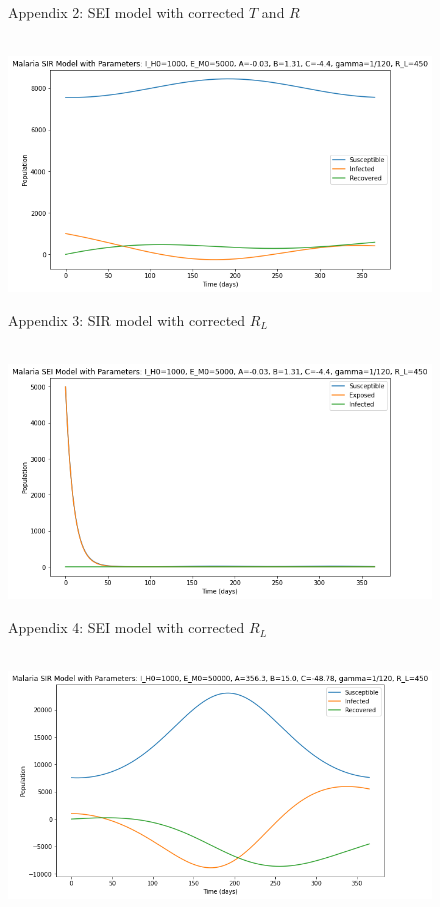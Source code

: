 \documentclass[
	12pt,				%
	oneside,			%
	a4paper,			%
	english,			%
	brazil				%
	]{abntex2}
\begin{document}
\begin{apendicesenv}
\begin{figure}[!ht]
	\caption*{Appendix 2: SEI model with corrected $T$ and $R$}
\end{figure} 
\newpage
\begin{figure}[!ht]
	\centering
	\hbox{\hspace{3.5em} \includegraphics[scale=0.55] {THESIS-SIR_RL_adaptado.png}}
	\caption*{Appendix 3: SIR model with corrected $R_L$}
\end{figure} 
\begin{figure}[!ht]
	\centering
	\hbox{\hspace{3.5em} \includegraphics[scale=0.55] {THESIS-SEI_RL_adaptado.png}}
	\caption*{Appendix 4: SEI model with corrected $R_L$}
\end{figure}
\newpage
\begin{figure}[!ht]
	\centering
	\hbox{\hspace{2.0em} \includegraphics[scale=0.55] {THESIS-SIR_Aumenta_ABC.png}}

\end{figure}
\end{apendicesenv}
\end{document}
